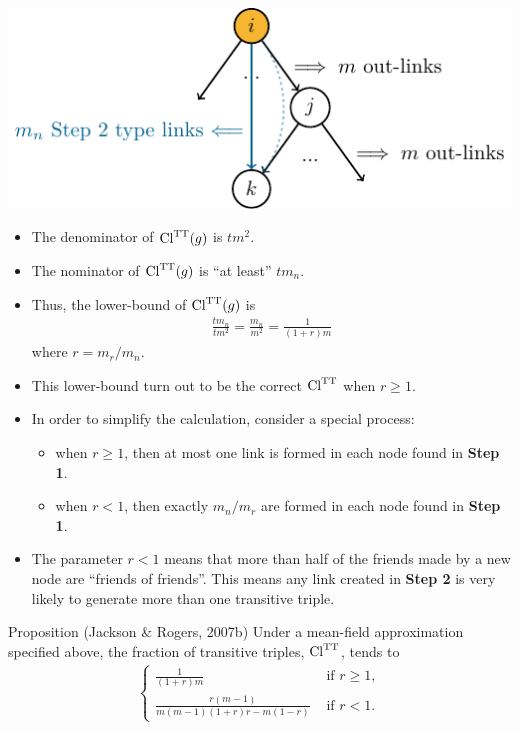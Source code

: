 \documentclass{beamer}
\begin{document}
\begin{frame}{}
	\begin{center}
		\includegraphics[scale=1]{figures-tikz/clustering.pdf}
	\end{center}
	\begin{itemize}
		\item
			The denominator of $\text{Cl}^{\text{TT}}(g)$ is $tm^2$.
		\item
			The nominator of $\text{Cl}^{\text{TT}}(g)$ is ``at least'' $tm_{n}$.
		\item
			Thus, the lower-bound of $\text{Cl}^{\text{TT}}(g)$ is
			\begin{align*}
				\frac{tm_{n}}{tm^{2}}
				= \frac{m_{n}}{m^{2}}
				= \frac{1}{(1+r)m}
			\end{align*}
			where $r=m_{r}/m_{n}$.
		\item
			This lower-bound turn out to be the correct $\text{Cl}^{\text{TT}}$ when $r\geq1$.
	\end{itemize}
\end{frame}

\begin{frame}{}
	\begin{itemize}
		\item
			In order to simplify the calculation,
			consider a special process:
			\begin{itemize}
				\item
					when $r\geq1$,
					then at most one link is formed in each node found in \textbf{Step 1}.
				\item
					when $r<1$,
					then exactly $m_{n}/m_{r}$ are formed in each node found in \textbf{Step 1}.
			\end{itemize}
		\item
			The parameter $r<1$ means that more than half of the friends made by a new node are ``friends of friends''.
			This means any link created in \textbf{Step 2} is very likely to generate more than one transitive triple.
	\end{itemize}
	\begin{block}{Proposition (Jackson \& Rogers, 2007b)}
		Under a mean-field approximation specified above,
		the fraction of transitive triples, $\text{Cl}^{\text{TT}}$, tends to
		\begin{align*}
			\begin{cases}
				\frac1{(1+r)m} & \text{ if } r\geq 1, \\
				\frac{r(m-1)}{m(m-1)(1+r)r - m(1-r)} & \text{ if } r < 1.
			\end{cases}
		\end{align*}
	\end{block}
\end{frame}
\end{document}
